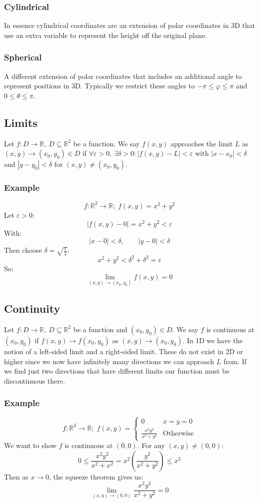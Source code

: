 \documentclass[12pt]{article}
\begin{document}
\subsubsection*{Cylindrical}
In essence cylindrical coordinates are an extension of polar coordinates in 3D that use an extra variable to represent the height off the original plane.
\subsubsection*{Spherical}
A different extension of polar coordinates that includes an additional angle to represent positions in 3D. Typically we restrict these angles to \(-\pi\leq \varphi\leq \pi\) and \(0\leq \theta\leq \pi\).
\subsection*{Limits}
Let \(f:D\to \mathbb{R}, \ D\subseteq\mathbb{R}^2\) be a function. We say \(f(x,y)\) approaches the limit \(L\) as \((x,y)\to(x_0,y_0)\in D\) if \(\forall \varepsilon>0,\ \exists\delta>0:|f(x,y)-L|<\varepsilon\) with \(|x-x_0|<\delta\) and \(|y-y_0|<\delta\) for \((x,y)\ne(x_0,y_0)\).
\subsubsection*{Example}
\[f:\mathbb{R}^2\to\mathbb{R};\;f(x,y)=x^2+y^2\]
Let \(\varepsilon>0\):
\[|f(x,y)-0|=x^2+y^2<\varepsilon\]
With:
\[|x-0|<\delta,\qquad |y-0|<\delta\]
Then choose \(\delta=\sqrt{\frac{\varepsilon}{2}}\):
\[x^2+y^2<\delta^2+\delta^2=\varepsilon\]
So:
\[\lim_{(x,y)\to(x_0,y_0)}f(x,y)=0\]
\subsection*{Continuity}
Let \(f:D\to\mathbb{R},\ D\subseteq\mathbb{R}^2\) be a function and \((x_0,y_0)\in D\). We say \(f\) is continuous at \((x_0,y_0)\) if \(f(x,y)\to f(x_0,y_0)\) as \((x,y)\to (x_0,y_0)\). In 1D we have the notion of a left-sided limit and a right-sided limit. These do not exist in 2D or higher since we now have infinitely many directions we can approach \(L\) from. If we find just two directions that have different limits our function must be discontinuous there.
\subsubsection*{Example}
\[f:\mathbb{R}^2\to\mathbb{R};\; f(x,y)=\begin{cases}
    0 & x=y=0 \\
    \frac{x^2y^2}{x^2+y^2} & \text{Otherwise}
\end{cases}\]
We want to show \(f\) is continuous at \((0,0)\). For any \((x,y)\ne(0,0)\):
\[0\leq \frac{x^2y^2}{x^2+x^2}= x^2\left(\frac{y^2}{x^2+y^2}\right)\leq x^2\]
Then as \(x\to 0\), the squeeze theorem gives us:
\[\lim_{(x,y)\to (0,0)}\frac{x^2y^2}{x^2+y^2}=0\]
\end{document}
